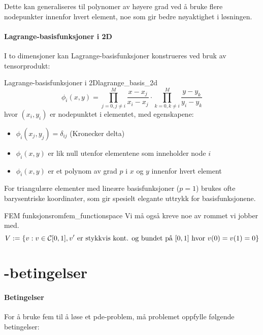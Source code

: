 Dette kan generaliseres til polynomer av høyere grad ved å bruke flere nodepunkter innenfor hvert element, noe som gir bedre nøyaktighet i løsningen.

\paragraph{Lagrange-basisfunksjoner i 2D}
I to dimensjoner kan Lagrange-basisfunksjoner konstrueres ved bruk av tensorprodukt:

\begin{definition}{Lagrange-basisfunksjoner i 2D}{lagrange_basis_2d}
	\[
		\phi_i(x, y) = \prod_{j=0, j \neq i}^{M} \frac{x - x_j}{x_i - x_j} \cdot \prod_{k=0, k \neq i}^{M} \frac{y - y_k}{y_i - y_k}
	\]
	hvor $(x_i, y_i)$ er nodepunktet i elementet, med egenskapene:
	\begin{itemize}
		\item $\phi_i(x_j, y_j) = \delta_{ij}$ (Kronecker delta)
		\item $\phi_i(x, y)$ er lik null utenfor elementene som inneholder node $i$
		\item $\phi_i(x, y)$ er et polynom av grad $p$ i $x$ og $y$ innenfor hvert element
	\end{itemize}
\end{definition}

For triangulære elementer med lineære basisfunksjoner ($p=1$) brukes ofte barysentriske koordinater, som gir spesielt elegante uttrykk for basisfunksjonene.

\begin{remark}{FEM funksjonsrom}{fem_functionspace}
	Vi må også kreve noe av rommet vi jobber med.
	\[
		V := \{v : v \in \mathcal{C}[0, 1], v^\prime \text{ er stykkvis kont. og bundet på } [0, 1] \text{ hvor } v(0)=v(1)= 0\}
	\]
\end{remark}

\section{-betingelser}

\paragraph{Betingelser}

For å bruke \gls{fem} til å løse et \gls{pde}-problem, må problemet oppfylle følgende betingelser:

